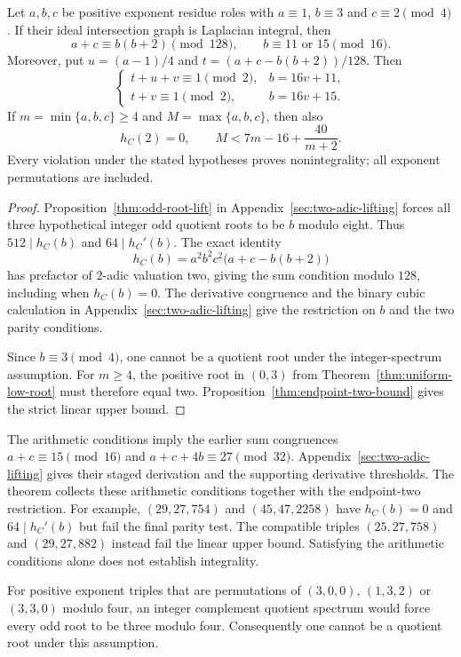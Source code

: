 \begin{proposition}
\label{thm:clustered-odd-roots}
Let $a,b,c$ be positive exponent residue roles with
$a\equiv1$, $b\equiv3$ and $c\equiv2\pmod4$.
If their ideal intersection graph is Laplacian integral, then
\[
 a+c\equiv b(b+2)\pmod{128},\qquad b\equiv11\text{ or }15\pmod{16}.
\]
Moreover, put $u=(a-1)/4$ and $t=(a+c-b(b+2))/128$. Then
\[
 \begin{cases}
 t+u+v\equiv1\pmod2,& b=16v+11,\\
 t+v\equiv1\pmod2,& b=16v+15.
 \end{cases}
\]
If $m=\min\{a,b,c\}\geq4$ and $M=\max\{a,b,c\}$, then also
\[
 h_C(2)=0,\qquad M<7m-16+\frac{40}{m+2}.
\]
Every violation under the stated hypotheses proves nonintegrality;
all exponent permutations are included.
\end{proposition}

\begin{proof}
Proposition~\ref{thm:odd-root-lift} in Appendix~\ref{sec:two-adic-lifting}
forces all three hypothetical integer odd quotient roots to be $b$ modulo
eight. Thus $512\mid h_C(b)$ and $64\mid h_C'(b)$.
The exact identity
\[
 h_C(b)=a^2b^2c^2\bigl(a+c-b(b+2)\bigr)
\]
has prefactor of $2$-adic valuation two, giving the sum condition modulo
$128$, including when $h_C(b)=0$. The derivative congruence and the binary
cubic calculation in Appendix~\ref{sec:two-adic-lifting} give the restriction
on $b$ and the two parity conditions.

Since $b\equiv3\pmod4$, one cannot be a quotient root under the
integer-spectrum assumption. For $m\geq4$, the positive root in $(0,3)$
from Theorem~\ref{thm:uniform-low-root} must therefore equal two.
Proposition~\ref{thm:endpoint-two-bound} gives the strict linear upper bound.
\end{proof}

The arithmetic conditions imply the earlier sum congruences
$a+c\equiv15\pmod{16}$ and $a+c+4b\equiv27\pmod{32}$.
Appendix~\ref{sec:two-adic-lifting} gives their staged derivation and the
supporting derivative thresholds. The theorem collects these arithmetic
conditions together with the endpoint-two restriction.
For example, $(29,27,754)$ and $(45,47,2258)$ have $h_C(b)=0$ and
$64\mid h_C'(b)$ but fail the final parity test. The compatible triples
$(25,27,758)$ and $(29,27,882)$ instead fail the linear upper bound.
Satisfying the arithmetic conditions alone does not establish integrality.

\begin{lemma}
\label{lem:mixed-endpoint-one}
For positive exponent triples that are permutations of $(3,0,0)$,
$(1,3,2)$ or $(3,3,0)$ modulo four, an integer complement quotient
spectrum would force every odd root to be three modulo four.
Consequently one cannot be a quotient root under this assumption.
\end{lemma}


